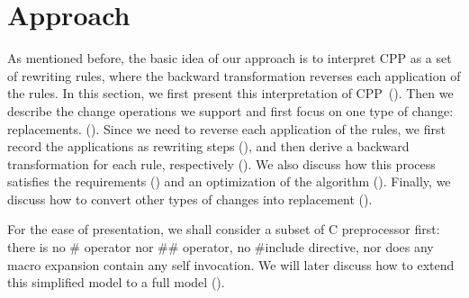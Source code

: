 \section{Approach}
\label{sec:approach}
As mentioned before, the basic idea of our approach is to interpret
CPP as a set of rewriting rules, where the backward
transformation reverses each application of the rules. In this section,
we first present this interpretation of CPP~().
Then we describe the change operations we support and first focus on
one type of change: replacements.
(). Since we need to reverse each application of
the rules, we first record the applications as rewriting steps
(), and then derive a backward transformation for
each rule, respectively (). We also
discuss how this process satisfies the requirements
() and an optimization of the algorithm (). Finally, we
discuss how to convert other types of changes into replacement ().



For the ease of presentation, we shall consider a subset of C
preprocessor first: there is no \# operator nor \#\# operator, no
\#include directive, nor does any macro expansion contain any
self invocation. We will later discuss how to
extend this simplified model to a full model ().

\newcommand{\dstart}{\ensuremath{\langle\#}\xspace}
\newcommand{\dend}{\ensuremath{\rangle}\xspace}

